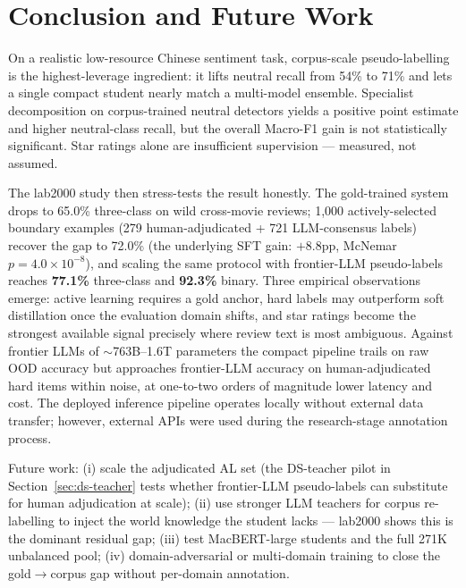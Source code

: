 \documentclass[11pt,a4paper]{article}
\begin{document}
\section{Conclusion and Future Work}
\label{sec:conclusion}

On a realistic low-resource Chinese sentiment task, corpus-scale
pseudo-labelling is the highest-leverage ingredient: it lifts neutral
recall from 54\% to 71\% and lets a single compact student nearly match
a multi-model ensemble. Specialist decomposition on corpus-trained
neutral detectors yields a positive point estimate and higher
neutral-class recall, but the overall Macro-F1 gain is not
statistically significant. Star ratings alone are
insufficient supervision --- measured, not assumed.

The lab2000 study then stress-tests the result honestly. The
gold-trained system drops to 65.0\% three-class on wild cross-movie
reviews; 1{,}000 actively-selected boundary examples
(279 human-adjudicated + 721 LLM-consensus labels)
recover the gap to 72.0\% (the underlying SFT gain: $+8.8$pp,
McNemar $p = 4.0\times10^{-8}$), and scaling the
same protocol with frontier-LLM pseudo-labels reaches \textbf{77.1\%}
three-class and \textbf{92.3\%} binary.
Three empirical observations emerge: active learning requires a gold
anchor, hard labels may outperform soft distillation once the evaluation
domain shifts, and star ratings become the strongest available signal
precisely where review text is most ambiguous. Against frontier LLMs
of $\sim$763B--1.6T parameters the compact pipeline trails on raw OOD
accuracy but
approaches frontier-LLM accuracy on human-adjudicated hard items
within noise, at one-to-two
orders of magnitude lower latency and cost. The deployed inference
pipeline operates locally without external data transfer; however,
external APIs were used during the research-stage annotation process.

Future work: (i) scale the adjudicated AL set (the DS-teacher pilot in
Section~\ref{sec:ds-teacher} tests whether frontier-LLM pseudo-labels
can substitute for human adjudication at scale); (ii) use stronger LLM
teachers for corpus re-labelling to inject the world knowledge the
student lacks --- lab2000 shows this is the dominant residual gap;
(iii) test MacBERT-large students and the full 271K unbalanced pool;
(iv) domain-adversarial or multi-domain training to close the
gold$\to$corpus gap without per-domain annotation.

\end{document}
